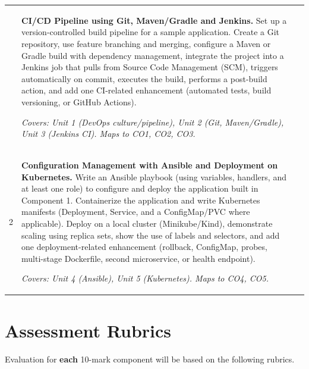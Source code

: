 \documentclass[12pt,a4paper]{article}
\newcommand{\sizeTwelve}{\fontsize{12pt}{14.5pt}\selectfont}  %
\begin{document}
\vspace{0.6cm}

{\sizeTwelve
\setlength{\tabcolsep}{4pt}
\renewcommand{\arraystretch}{1.25}
\begin{longtable}{|>{\centering\arraybackslash}m{1.2cm}|>{\raggedright\arraybackslash}p{10.6cm}|>{\centering\arraybackslash}m{1.8cm}|}
\hline
\multicolumn{1}{|c|}{\textbf{Sl. No}} &
\multicolumn{1}{c|}{\textbf{Description}} &
\multicolumn{1}{c|}{\textbf{Marks}} \\
\hline
\endhead

1 &
\textbf{CI/CD Pipeline using Git, Maven/Gradle and Jenkins.}
Set up a version-controlled build pipeline for a sample application. Create a Git repository, use feature branching and merging, configure a Maven or Gradle build with dependency management, integrate the project into a Jenkins job that pulls from Source Code Management (SCM), triggers automatically on commit, executes the build, performs a post-build action, and add one CI-related enhancement (automated tests, build versioning, or GitHub Actions).

\textit{Covers: Unit 1 (DevOps culture/pipeline), Unit 2 (Git, Maven/Gradle), Unit 3 (Jenkins CI). Maps to CO1, CO2, CO3.}
& 10 \\
\hline

2 &
\textbf{Configuration Management with Ansible and Deployment on Kubernetes.}
Write an Ansible playbook (using variables, handlers, and at least one role) to configure and deploy the application built in Component 1. Containerize the application and write Kubernetes manifests (Deployment, Service, and a ConfigMap/PVC where applicable). Deploy on a local cluster (Minikube/Kind), demonstrate scaling using replica sets, show the use of labels and selectors, and add one deployment-related enhancement (rollback, ConfigMap, probes, multi-stage Dockerfile, second microservice, or health endpoint).

\textit{Covers: Unit 4 (Ansible), Unit 5 (Kubernetes). Maps to CO4, CO5.}
& 10 \\
\hline

\end{longtable}
\par}

\newpage

\section*{Assessment Rubrics}
{\sizeTwelve Evaluation for \textbf{each} 10-mark component will be based on the following rubrics.\par}
\end{document}

